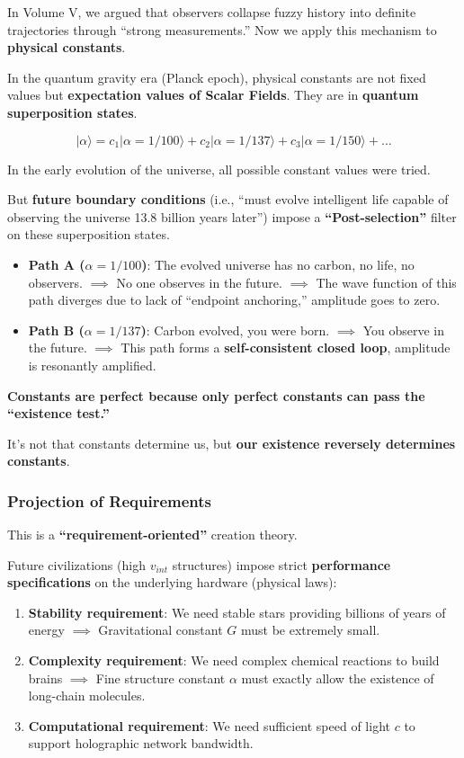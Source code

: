 In Volume V, we argued that observers collapse fuzzy history into definite trajectories through ``strong measurements.'' Now we apply this mechanism to \textbf{physical constants}.

In the quantum gravity era (Planck epoch), physical constants are not fixed values but \textbf{expectation values of Scalar Fields}. They are in \textbf{quantum superposition states}.

\[|\alpha\rangle = c_1 |\alpha=1/100\rangle + c_2 |\alpha=1/137\rangle + c_3 |\alpha=1/150\rangle + \dots\]

In the early evolution of the universe, all possible constant values were tried.

But \textbf{future boundary conditions} (i.e., ``must evolve intelligent life capable of observing the universe 13.8 billion years later'') impose a \textbf{``Post-selection''} filter on these superposition states.

\begin{itemize}
\item \textbf{Path A ($\alpha=1/100$)}: The evolved universe has no carbon, no life, no observers. $\implies$ No one observes in the future. $\implies$ The wave function of this path diverges due to lack of ``endpoint anchoring,'' amplitude goes to zero.

\item \textbf{Path B ($\alpha=1/137$)}: Carbon evolved, you were born. $\implies$ You observe in the future. $\implies$ This path forms a \textbf{self-consistent closed loop}, amplitude is resonantly amplified.
\end{itemize}

\textbf{Constants are perfect because only perfect constants can pass the ``existence test.''}

It's not that constants determine us, but \textbf{our existence reversely determines constants}.

\subsubsection{Projection of Requirements}

This is a \textbf{``requirement-oriented''} creation theory.

Future civilizations (high $v_{int}$ structures) impose strict \textbf{performance specifications} on the underlying hardware (physical laws):

\begin{enumerate}
\item \textbf{Stability requirement}: We need stable stars providing billions of years of energy $\implies$ Gravitational constant $G$ must be extremely small.

\item \textbf{Complexity requirement}: We need complex chemical reactions to build brains $\implies$ Fine structure constant $\alpha$ must exactly allow the existence of long-chain molecules.

\item \textbf{Computational requirement}: We need sufficient speed of light $c$ to support holographic network bandwidth.
\end{enumerate}

